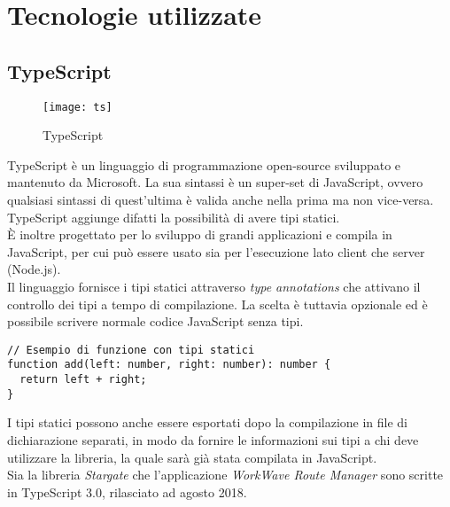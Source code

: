 
\chapter{Tecnologie utilizzate}
\label{tecnologie}

\section{TypeScript}

\begin{figure}[H] 
  \centering 
  \texttt{[image: ts]} 
  \caption{TypeScript}
\end{figure}

TypeScript è un linguaggio di programmazione open-source sviluppato e mantenuto da Microsoft. La sua sintassi è un super-set di JavaScript, ovvero qualsiasi sintassi di quest'ultima è valida anche nella prima ma non vice-versa. TypeScript aggiunge difatti la possibilità di avere tipi statici. \\

È inoltre progettato per lo sviluppo di grandi applicazioni e compila in JavaScript, per cui può essere usato sia per l'esecuzione lato client che server (Node.js). \\

Il linguaggio fornisce i tipi statici attraverso \textit{type annotations} che attivano il controllo dei tipi a tempo di compilazione. La scelta è tuttavia opzionale ed è possibile scrivere normale codice JavaScript senza tipi. \\

\begin{lstlisting}[language={[Sharp]C}]
// Esempio di funzione con tipi statici
function add(left: number, right: number): number {
  return left + right;
}
\end{lstlisting}

I tipi statici possono anche essere esportati dopo la compilazione in file di dichiarazione separati, in modo da fornire le informazioni sui tipi a chi deve utilizzare la libreria, la quale sarà già stata compilata in JavaScript. \\

Sia la libreria \textit{Stargate} che l'applicazione \textit{WorkWave Route Manager} sono scritte in TypeScript 3.0, rilasciato ad agosto 2018.

